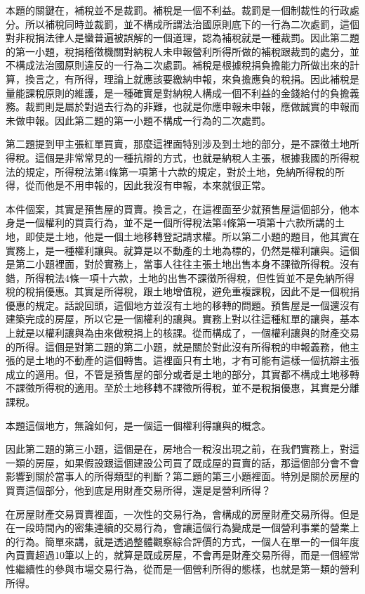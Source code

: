 \documentclass[oneside,sub3section]{ctexbook}
\begin{document}
本題的關鍵在，補稅並不是裁罰。補稅是一個不利益。裁罰是一個制裁性的行政處分。所以補稅同時並裁罰，並不構成所謂法治國原則底下的一行為二次處罰，這個對非稅捐法律人是蠻普遍被誤解的一個道理，認為補稅就是一種裁罰。因此第二題的第一小題，稅捐稽徵機關對納稅人未申報營利所得所做的補稅跟裁罰的處分，並不構成法治國原則違反的一行為二次處罰。補稅是根據稅捐負擔能力所做出來的計算，換言之，有所得，理論上就應該要繳納申報，來負擔應負的稅捐。因此補稅是量能課稅原則的維護，是一種確實是對納稅人構成一個不利益的金錢給付的負擔義務。裁罰則是屬於對過去行為的非難，也就是你應申報未申報，應做誠實的申報而未做申報。因此第二題的第一小題不構成一行為的二次處罰。

第二題提到甲主張紅單買賣，那麼這裡面特別涉及到土地的部分，是不課徵土地所得稅。這個是非常常見的一種抗辯的方式，也就是納稅人主張，根據我國的所得稅法的規定，所得稅法第4條第一項第十六款的規定，對於土地，免納所得稅的所得，從而他是不用申報的，因此我沒有申報，本來就很正常。

本件個案，其實是預售屋的買賣。換言之，在這裡面至少就預售屋這個部分，他本身是一個權利的買賣行為，並不是一個所得稅法第4條第一項第十六款所講的土地，即使是土地，他是一個土地移轉登記請求權。所以第二小題的題目，他其實在實務上，是一種權利讓與。就算是以不動產的土地為標的，仍然是權利讓與。這個是第二小題裡面，對於實務上，當事人往往主張土地出售本身不課徵所得稅。沒有錯，所得稅法4條一項十六款，土地的出售不課徵所得稅，但性質並不是免納所得稅的稅捐優惠。其實是所得稅，跟土地增值稅，避免重複課稅，因此不是一個稅捐優惠的規定。話說回頭，這個地方並沒有土地的移轉的問題。預售屋是一個還沒有建築完成的房屋，所以它是一個權利的讓與。實務上對以往這種紅單的讓與，基本上就是以權利讓與為由來做稅捐上的核課。從而構成了，一個權利讓與的財產交易的所得。這個是對第二題的第二小題，就是關於對此沒有所得稅的申報義務，他主張的是土地的不動產的這個轉售。這裡面只有土地，才有可能有這樣一個抗辯主張成立的適用。但，不管是預售屋的部分或者是土地的部分，其實都不構成土地移轉不課徵所得稅的適用。至於土地移轉不課徵所得稅，並不是稅捐優惠，其實是分離課稅。

本題這個地方，無論如何，是一個這一個權利得讓與的概念。

因此第二題的第三小題，這個是在，房地合一稅沒出現之前，在我們實務上，對這一類的房屋，如果假設跟這個建設公司買了既成屋的買賣的話，那這個部分會不會影響到關於當事人的所得類型的判斷？第二題的第三小題裡面。特別是關於房屋的買賣這個部分，他到底是用財產交易所得，還是是營利所得？

在房屋財產交易買賣裡面，一次性的交易行為，會構成的房屋財產交易所得。但是在一段時間內的密集連續的交易行為，會讓這個行為變成是一個營利事業的營業上的行為。簡單來講，就是透過整體觀察綜合評價的方式，一個人在單一的一個年度內買賣超過10筆以上的，就算是既成房屋，不會再是財產交易所得，而是一個經常性繼續性的參與市場交易行為，從而是一個營利所得的態樣，也就是第一類的營利所得。
\end{document}
